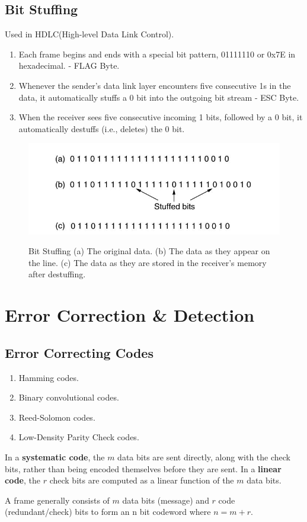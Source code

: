\documentclass[a4paper,oneside]{book}
\begin{document}
\subsection{Bit Stuffing}
Used in HDLC(High-level Data Link Control).
\begin{enumerate}
\item Each frame begins and ends with a special bit pattern, 01111110 or 0x7E in hexadecimal.  - FLAG Byte.
\item  Whenever the sender's data link layer encounters five consecutive 1s in the data, it automatically stuffs a 0 bit into the outgoing bit stream - ESC Byte.
\item When the receiver sees five consecutive incoming 1 bits, followed by a 0 bit, it automatically destuffs (i.e., deletes) the 0 bit.
\end{enumerate}
\begin{figure}[H]
\caption{Bit Stuffing  (a) The original data. (b) The data as they appear on the line. (c) The data as they are stored in the receiver's memory after destuffing.}
\includegraphics[scale=0.6]{Images/bit_stuffing}
\label{fig:cn_bit_stuff}
\end{figure}
\section{Error Correction \& Detection}
\subsection{Error Correcting Codes}
\begin{enumerate}
\item Hamming codes.
\item Binary convolutional codes.
\item Reed-Solomon codes.
\item Low-Density Parity Check codes.
\end{enumerate}
In a \textbf{systematic code}, the $m$ data bits are sent directly, along with the check bits, rather than being encoded themselves before they are sent. In a \textbf{linear code}, the $r$ check bits are computed as a linear function of the $m$ data bits. 
\begin{definition}[Codeword]
A frame generally consists of $m$ data bits (message) and $r$ code (redundant/check) bits to form an n bit codeword where $n=m+r$.
\end{definition}
\end{document}
